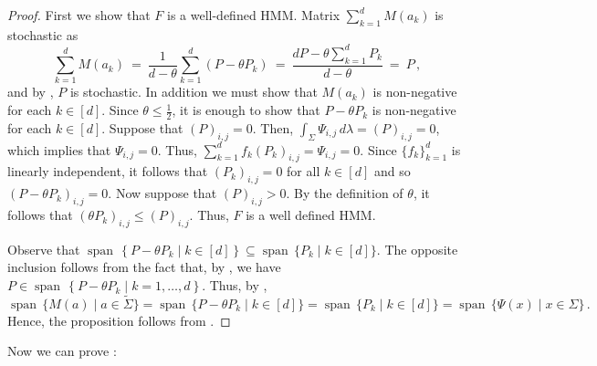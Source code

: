 \documentclass[a4paper,UKenglish,cleveref, autoref,mathscr]{lipics-v2019}
\newcommand{\1}{\mathbbm{1}}
\DeclareMathOperator{\Span}{span\,}
\begin{document}
\begin{proof}
First we show that $F$ is a well-defined HMM. Matrix $\sum_{k=1}^d M(a_k)$ is stochastic as
\begin{equation}\label{sumofps}
\sum_{k=1}^d M(a_k) \ = \ \frac{1}{d - \theta}\sum_{k = 1}^d (P - \theta P_k) \ = \ \frac{dP - \theta \sum_{k=1}^d P_k}{d - \theta} \ = \ P\,,
\end{equation}
and by , $P$ is stochastic. In addition we must show that $M(a_k)$ is non-negative for each $k \in [d]$.
Since $\theta \le \frac12$, it is enough to show that $P - \theta P_k$ is non-negative for each $k \in [d]$. Suppose that $(P)_{i,j} = 0$.
Then, $\int_\Sigma \Psi_{i,j}\, d\lambda = (P)_{i,j} = 0$, which implies that $\Psi_{i,j} = 0$.
Thus, $\sum_{k = 1}^d f_k (P_k)_{i,j} = \Psi_{i,j} = 0$.
Since $\{f_k\}_{k=1}^d$ is linearly independent, it follows that $(P_k)_{i,j} = 0$ for all $k \in [d]$ and so $(P - \theta P_k)_{i,j} = 0$.
Now suppose that $(P)_{i,j} > 0$. By the definition of $\theta$, it follows that $(\theta P_k)_{i,j} \leq (P)_{i,j}$. %
Thus, $F$ is a well defined HMM.

Observe that $\Span \left\{ P - \theta P_k \mid k \in [d] \right\} \subseteq \Span \{P_k \mid k \in [d]\}$.
The opposite inclusion follows from the fact that, by , we have $P \in \Span \left\{ P - \theta P_k \mid k = 1, \dots, d \right\}$.
Thus, by ,
\[\Span\{M(a) \mid a \in \tilde{\Sigma}\} = \Span\{P - \theta P_k \mid k \in [d]\} = \Span\{P_k  \mid k \in [d]\} = \Span\{\Psi(x) \mid x \in \Sigma\}\,.\]
Hence, the proposition follows from .
\end{proof}

Now we can prove :
\end{document}
